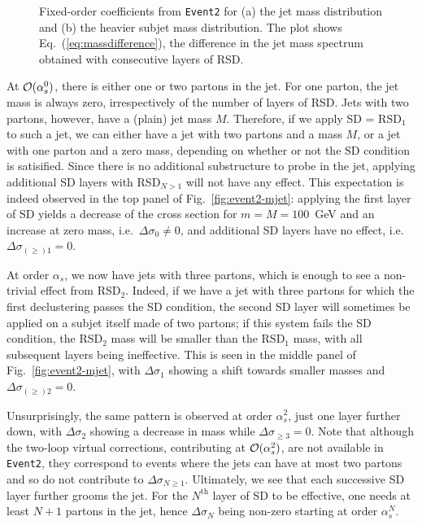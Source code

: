 \documentclass[11pt,a4paper]{article}
\DeclareRobustCommand{\Fig}[1]{Fig.~\ref{#1}}
\DeclareRobustCommand{\Eq}[1]{Eq.~(\ref{#1})}
\begin{document}
\begin{figure}[t]
  \centering
  \qquad
  \caption{Fixed-order coefficients from \texttt{Event2} for (a) the
    jet mass distribution and (b) the heavier subjet mass
    distribution. The plot shows \Eq{eq:massdifference}, the
    difference in the jet mass spectrum obtained with consecutive
    layers of RSD.}
  \label{fig:event2}
\end{figure}


At ${\cal{O}}(\alpha_s^0)$, there is either one or two partons in the
jet.
%
For one parton, the jet mass is always zero, irrespectively of
the number of layers of RSD.
%
Jets with two partons, however, have a (plain) jet mass $M$.
%
Therefore, if we apply SD = RSD$_1$ to such a jet, we can either have a jet with two partons and
a mass $M$, or a jet with one parton and a zero mass, depending on
whether or not the SD condition is satisified.
%
Since there is no additional substructure to probe in the jet,
applying additional SD layers with RSD$_{N>1}$
will not have any effect.
%
This expectation is indeed observed in the
top panel of \Fig{fig:event2-mjet}: applying the first layer of
SD yields a decrease of the cross section for $m=M=100$~GeV
and an increase at zero mass, i.e.\ $\Delta\sigma_0\neq 0$, and
additional SD layers have no effect, i.e.\ $\Delta\sigma_{(\ge)1}= 0$.

At order $\alpha_s$, we now have jets with
three partons, which is enough to see a non-trivial effect from RSD$_2$.
%
Indeed, if we have a jet with three partons for which the first declustering passes the SD
condition, the second SD layer will sometimes be applied on
a subjet itself made of two partons; if this system fails the SD condition, the RSD$_2$ mass will be smaller than the RSD$_1$
mass, with all subsequent layers being ineffective.
%
This is seen in the middle panel of \Fig{fig:event2-mjet}, with $\Delta\sigma_1$
showing a shift towards smaller masses and $\Delta\sigma_{(\ge)2}= 0$.

Unsurprisingly, the same pattern is observed at order $\alpha_s^2$, just one layer further down,
with $\Delta\sigma_2$ showing a decrease in mass while $\Delta\sigma_{{\ge}3}=0$.
%
Note that although the two-loop virtual corrections, contributing at
${\cal{O}}(\alpha_s^2)$, are not available in \texttt{Event2}, they
correspond to events where the jets can have at most two partons and
so do not contribute to $\Delta\sigma_{N\ge 1}$.
%
Ultimately, we see that each successive SD layer further grooms the jet.
%
For the $N^{\text{th}}$ layer of SD to be effective, one needs
at least $N+1$ partons in the jet, hence $\Delta\sigma_N$ being
non-zero starting at order $\alpha_s^N$. 
\end{document}
